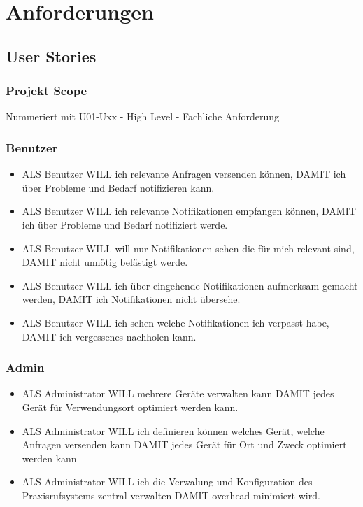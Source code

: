 \section{Anforderungen}\label{sec:anforderungen}

\subsection{User Stories}\label{subsec:user-stories}

\subsubsection*{Projekt Scope}


    Nummeriert mit U01-Uxx - High Level - Fachliche Anforderung

    \subsubsection*{Benutzer}

        \begin{itemize}
            \item ALS Benutzer WILL ich relevante Anfragen versenden können, DAMIT ich über Probleme und Bedarf notifizieren kann. 
            \item ALS Benutzer WILL ich relevante Notifikationen empfangen können, DAMIT ich über Probleme und Bedarf notifiziert werde.   
            \item ALS Benutzer WILL will nur Notifikationen sehen die für mich relevant sind, DAMIT nicht unnötig belästigt werde.   
            \item ALS Benutzer WILL ich über eingehende Notifikationen aufmerksam gemacht werden, DAMIT ich Notifikationen nicht übersehe.   
            \item ALS Benutzer WILL ich sehen welche Notifikationen ich verpasst habe, DAMIT ich vergessenes nachholen kann.   
        \end{itemize}



    \subsubsection*{Admin}

    \begin{itemize}
        \item ALS Administrator WILL mehrere Geräte verwalten kann DAMIT jedes Gerät für Verwendungsort optimiert werden kann.
        \item ALS Administrator WILL ich definieren können welches Gerät, welche Anfragen versenden kann DAMIT jedes Gerät für Ort und Zweck optimiert werden kann 
        \item ALS Administrator WILL ich die Verwalung und Konfiguration des Praxisrufsystems zentral verwalten DAMIT overhead minimiert wird. 
    \end{itemize}

